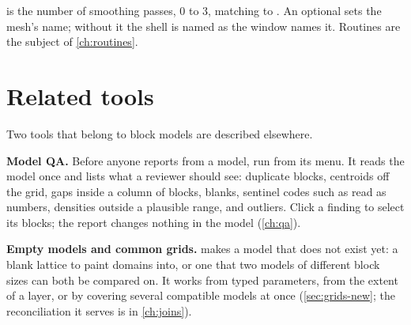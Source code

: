 is the number of smoothing passes, 0 to 3, matching  to . An optional  sets the mesh's name; without it the shell is named as the window names it. Routines are the subject of \cref{ch:routines}.

\section{Related tools}\label{sec:blocks-qa}\label{sec:blocks-new}

Two tools that belong to block models are described elsewhere.

\textbf{Model QA.} Before anyone reports from a model, run  from its menu. It reads the model once and lists what a reviewer should see: duplicate blocks, centroids off the grid, gaps inside a column of blocks, blanks, sentinel codes such as  read as numbers, densities outside a plausible range, and outliers. Click a finding to select its blocks; the report changes nothing in the model (\cref{ch:qa}).

\textbf{Empty models and common grids.}  makes a model that does not exist yet: a blank lattice to paint domains into, or one that two models of different block sizes can both be compared on. It works from typed parameters, from the extent of a layer, or by covering several compatible models at once (\cref{sec:grids-new}; the reconciliation it serves is in \cref{ch:joins}).
